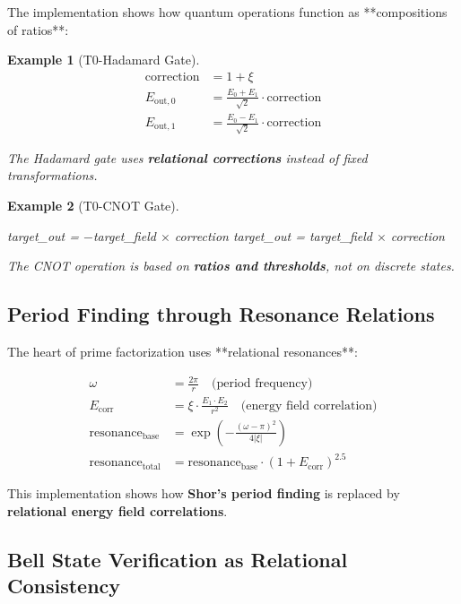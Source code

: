 \documentclass[11pt,a4paper]{article}
\newtheorem{example}{Example}[section]
\begin{document}
	The implementation shows how quantum operations function as **compositions of ratios**:
	
	\begin{example}[T0-Hadamard Gate]
		\begin{align}
			\text{correction} &= 1 + \xi \\
			E_{\text{out},0} &= \frac{E_0 + E_1}{\sqrt{2}} \cdot \text{correction} \\
			E_{\text{out},1} &= \frac{E_0 - E_1}{\sqrt{2}} \cdot \text{correction}
		\end{align}
		
		The Hadamard gate uses \textbf{relational corrections} instead of fixed transformations.
	\end{example}
	
	\begin{example}[T0-CNOT Gate]
		\begin{algorithmic}[1]
			\STATE target\_out = $-$target\_field $\times$ correction
			\ELSE
			\STATE target\_out = target\_field $\times$ correction
			\ENDIF
		\end{algorithmic}
		
		The CNOT operation is based on \textbf{ratios and thresholds}, not on discrete states.
	\end{example}
	
	\subsection{Period Finding through Resonance Relations}
	
	The heart of prime factorization uses **relational resonances**:
	
	\begin{align}
		\omega &= \frac{2\pi}{r} \quad \text{(period frequency)} \\
		E_{\text{corr}} &= \xi \cdot \frac{E_1 \cdot E_2}{r^2} \quad \text{(energy field correlation)} \\
		\text{resonance}_{\text{base}} &= \exp\left(-\frac{(\omega - \pi)^2}{4|\xi|}\right) \\
		\text{resonance}_{\text{total}} &= \text{resonance}_{\text{base}} \cdot (1 + E_{\text{corr}})^{2.5}
	\end{align}
	
	This implementation shows how \textbf{Shor's period finding} is replaced by \textbf{relational energy field correlations}.
	
	\subsection{Bell State Verification as Relational Consistency}
	
\end{document}

